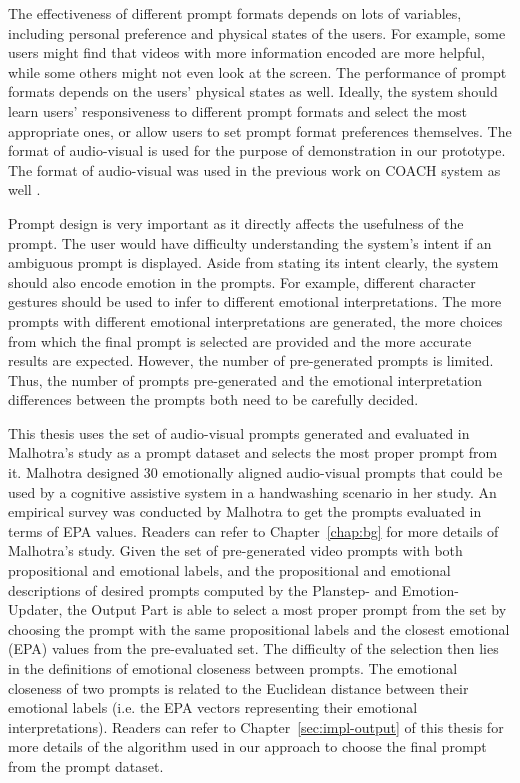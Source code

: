 The effectiveness of different prompt formats depends on lots of variables, including personal preference and physical states of the users. For example, some users might find that videos with more information encoded are more helpful, while some others might not even look at the screen. The performance of prompt formats depends on the users' physical states as well. Ideally, the system should learn users' responsiveness to different prompt formats and select the most appropriate ones, or allow users to set prompt format preferences themselves. The format of audio-visual is used for the purpose of demonstration in our prototype. The format of audio-visual was used in the previous work on COACH system as well \cite{mihailidis2008coach}.

Prompt design is very important as it directly affects the usefulness of the prompt. The user would have difficulty understanding the system's intent if an ambiguous prompt is displayed. Aside from stating its intent clearly, the system should also encode emotion in the prompts. For example, different character gestures should be used to infer to different emotional interpretations. The more prompts with different emotional interpretations are generated, the more choices from which the final prompt is selected are provided and the more accurate results are expected. However, the number of pre-generated prompts is limited. Thus, the number of prompts pre-generated and the emotional interpretation differences between the prompts both need to be carefully decided. 

This thesis uses the set of audio-visual prompts generated and evaluated in Malhotra's study \cite{malhotra2014} as a prompt dataset and selects the most proper prompt from it. Malhotra designed 30 emotionally aligned audio-visual prompts that could be used by a cognitive assistive system in a handwashing scenario in her study. An empirical survey was conducted by Malhotra to get the prompts evaluated in terms of EPA values. Readers can refer to Chapter~\ref{chap:bg} for more details of Malhotra's study. Given the set of pre-generated video prompts with both propositional and emotional labels, and the propositional and emotional descriptions of desired prompts computed by the Planstep- and Emotion- Updater, the Output Part is able to select a most proper prompt from the set by choosing the prompt with the same propositional labels and the closest emotional (EPA) values from the pre-evaluated set. The difficulty of the selection then lies in the definitions of emotional closeness between prompts. The emotional closeness of two prompts is related to the Euclidean distance between their emotional labels (i.e. the EPA vectors representing their emotional interpretations). Readers can refer to Chapter~\ref{sec:impl-output} of this thesis for more details of the algorithm used in our approach to choose the final prompt from the prompt dataset.

